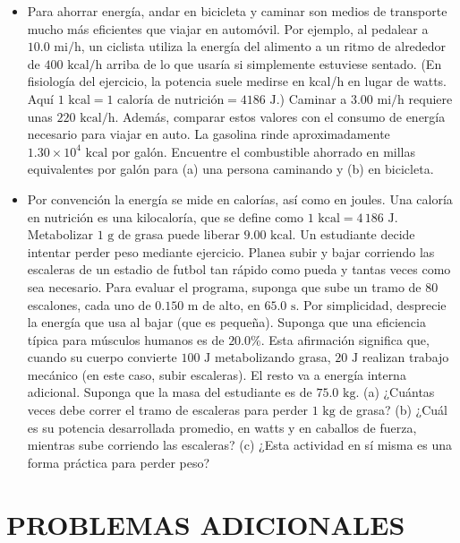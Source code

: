 \documentclass[11pt,a4paper]{article}
\begin{document}
\begin{itemize}
    \item[\textbf{21.}] Para ahorrar energía, andar en bicicleta y caminar son medios de transporte mucho más eficientes que viajar en automóvil. Por ejemplo, al pedalear a $10.0 \text{ mi/h}$, un ciclista utiliza la energía del alimento a un ritmo de alrededor de $400 \text{ kcal/h}$ arriba de lo que usaría si simplemente estuviese sentado. (En fisiología del ejercicio, la potencia suele medirse en kcal/h en lugar de watts. Aquí $1 \text{ kcal} = 1 \text{ caloría de nutrición} = 4186 \text{ J}$.) Caminar a $3.00 \text{ mi/h}$ requiere unas $220 \text{ kcal/h}$. Además, comparar estos valores con el consumo de energía necesario para viajar en auto. La gasolina rinde aproximadamente $1.30 \times 10^4 \text{ kcal}$ por galón. Encuentre el combustible ahorrado en millas equivalentes por galón para (a) una persona caminando y (b) en bicicleta.
    \vspace*{7cm}

    \item[\textbf{22.}] Por convención la energía se mide en calorías, así como en joules. Una caloría en nutrición es una kilocaloría, que se define como $1 \text{ kcal} = 4\,186 \text{ J}$. Metabolizar $1 \text{ g}$ de grasa puede liberar $9.00 \text{ kcal}$. Un estudiante decide intentar perder peso mediante ejercicio. Planea subir y bajar corriendo las escaleras de un estadio de futbol tan rápido como pueda y tantas veces como sea necesario. Para evaluar el programa, suponga que sube un tramo de 80 escalones, cada uno de $0.150 \text{ m}$ de alto, en $65.0 \text{ s}$. Por simplicidad, desprecie la energía que usa al bajar (que es pequeña). Suponga que una eficiencia típica para músculos humanos es de $20.0\%$. Esta afirmación significa que, cuando su cuerpo convierte $100 \text{ J}$ metabolizando grasa, $20 \text{ J}$ realizan trabajo mecánico (en este caso, subir escaleras). El resto va a energía interna adicional. Suponga que la masa del estudiante es de $75.0 \text{ kg}$. (a) ¿Cuántas veces debe correr el tramo de escaleras para perder $1 \text{ kg}$ de grasa? (b) ¿Cuál es su potencia desarrollada promedio, en watts y en caballos de fuerza, mientras sube corriendo las escaleras? (c) ¿Esta actividad en sí misma es una forma práctica para perder peso?
    \vspace*{8cm}
\end{itemize}

\newpage

\section*{PROBLEMAS ADICIONALES}
\end{document}

